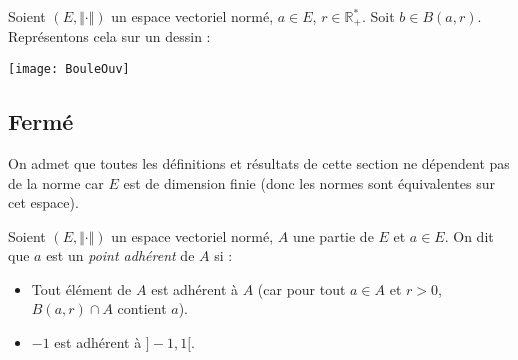 \documentclass[a4paper,10pt]{report}
\begin{document}
Soient $(E, \Vert \cdot \Vert)$ un espace vectoriel normé, $a \in E$, $r \in \mathbb{R}_+^*$. Soit $b \in B(a,r)$. Représentons cela sur un dessin :

\begin{center}
\texttt{[image: BouleOuv]}
\end{center}

\vspace{4cm}

%

\subsection{Fermé}

\begin{Theoreme}{} On admet que toutes les définitions et résultats de cette section ne dépendent pas de la norme car $E$ est de dimension finie (donc les normes sont équivalentes sur cet espace).
\end{Theoreme}


\begin{Definition}{} 
Soient $(E, \Vert \cdot \Vert)$ un espace vectoriel normé, $A$ une partie de $E$ et $a \in E$. On dit que $a$ est un \emph{point adhérent} de $A$ si :
\vspace{1cm}
%
\end{Definition}

\begin{Remarques}{}
\begin{itemize} 
\item Tout élément de $A$ est adhérent à $A$ (car pour tout $a \in A$ et $r>0$, $B(a,r) \cap A$ contient $a$).
\item $-1$ est adhérent à $]-1,1[$.
\end{itemize}
\end{Remarques}{}
\end{document}
